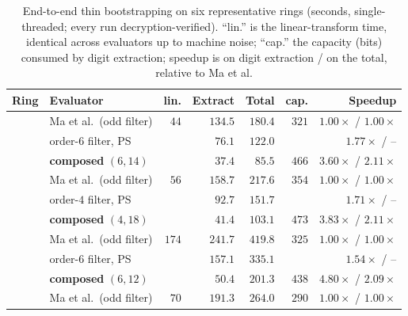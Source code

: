 \begin{table}[t]\centering\caption{End-to-end thin bootstrapping on six representative rings (seconds, single-threaded; every run decryption-verified). ``lin.'' is the linear-transform time, identical across evaluators up to machine noise; ``cap.'' the capacity (bits) consumed by digit extraction; speedup is on digit extraction / on the total, relative to Ma et al.}\label{tab:results}\renewcommand{\arraystretch}{1.08}\setlength{\tabcolsep}{4pt}\footnotesize
\begin{tabular}{@{}llrrrrr@{}}\toprule
\textbf{Ring} & \textbf{Evaluator} & \textbf{lin.} & \textbf{Extract} & \textbf{Total} & \textbf{cap.} & \textbf{Speedup}\\\midrule
{} & Ma et al.\ (odd filter) & $44$ & $134.5$ & $180.4$ & $321$ & $1.00\times$ / $1.00\times$\\
 & order-$6$ filter, PS & & $76.1$ & $122.0$ & & $1.77\times$ / --\\
 & \textbf{composed} $(6,14)$ & & $\mathbf{37.4}$ & $\mathbf{85.5}$ & $466$ & $\mathbf{3.60\times}$ / $\mathbf{2.11\times}$\\
\midrule
{} & Ma et al.\ (odd filter) & $56$ & $158.7$ & $217.6$ & $354$ & $1.00\times$ / $1.00\times$\\
 & order-$4$ filter, PS & & $92.7$ & $151.7$ & & $1.71\times$ / --\\
 & \textbf{composed} $(4,18)$ & & $\mathbf{41.4}$ & $\mathbf{103.1}$ & $473$ & $\mathbf{3.83\times}$ / $\mathbf{2.11\times}$\\
\midrule
{} & Ma et al.\ (odd filter) & $174$ & $241.7$ & $419.8$ & $325$ & $1.00\times$ / $1.00\times$\\
 & order-$6$ filter, PS & & $157.1$ & $335.1$ & & $1.54\times$ / --\\
 & \textbf{composed} $(6,12)$ & & $\mathbf{50.4}$ & $\mathbf{201.3}$ & $438$ & $\mathbf{4.80\times}$ / $\mathbf{2.09\times}$\\
\midrule
{} & Ma et al.\ (odd filter) & $70$ & $191.3$ & $264.0$ & $290$ & $1.00\times$ / $1.00\times$\\

\end{tabular}
\end{table}
